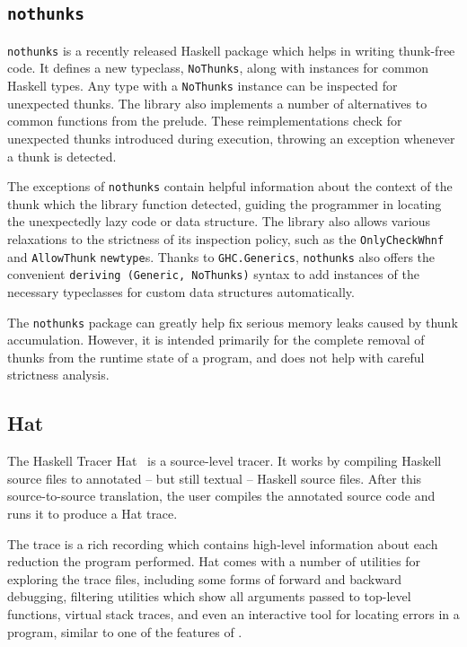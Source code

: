 \documentclass[thesis=B,english]{FITthesis}[2019/12/23]
\newcommand{\hackage}[1]{\texttt{#1}}
\newcommand{\hsType}[1]{\texttt{#1}}
\newcommand{\hsModule}[1]{\texttt{#1}}
\newcommand{\hsTC}[1]{\texttt{#1}}
\newcommand{\hsCode}[1]{\texttt{#1}}
\begin{document}
\subsection*{\hackage{nothunks}} \label{sec:nothunks}
\hackage{nothunks} is a recently released Haskell package which helps in writing
thunk-free code. It defines a new typeclass, \hsTC{NoThunks}, along with
instances for common Haskell types. Any type with a \hsTC{NoThunks} instance
can be inspected for unexpected thunks. The library also implements a number of
alternatives to common functions from the prelude. These re\-implementations
check for unexpected thunks introduced during execution, throwing an exception
whenever a thunk is detected.

The exceptions of \hackage{nothunks} contain helpful information about the
context of the thunk which the library function detected, guiding the
programmer in locating the unexpectedly lazy code or data structure. The
library also allows various relaxations to the strictness of its inspection
policy, such as the \hsType{OnlyCheckWhnf} and \hsType{AllowThunk}
\hsCode{newtype}s. Thanks to \hsModule{GHC.Generics}\cite{ghc-generics},
\hackage{nothunks} also offers the convenient \hsCode{deriving (Generic,
NoThunks)} syntax to add instances of the necessary typeclasses for custom data
structures automatically.

The \hackage{nothunks} package can greatly help fix serious memory leaks caused
by thunk accumulation. However, it is intended primarily for the complete
removal of thunks from the runtime state of a program, and does not help with
careful strictness analysis.

\subsection*{Hat} \label{sec:hat}
The Haskell Tracer Hat~\cite{proj-hat} is a source-level tracer. It works by
compiling Haskell source files to annotated -- but still textual -- Haskell
source files. After this source-to-source translation, the user compiles the
annotated source code and runs it to produce a Hat trace.

The trace is a rich recording which contains high-level information about each
reduction the program performed. Hat comes with a number of utilities for
exploring the trace files, including some forms of forward and backward
debugging, filtering utilities which show all arguments passed to top-level
functions, virtual stack traces, and even an interactive tool for locating
errors in a program, similar to one of the features of .
\end{document}
